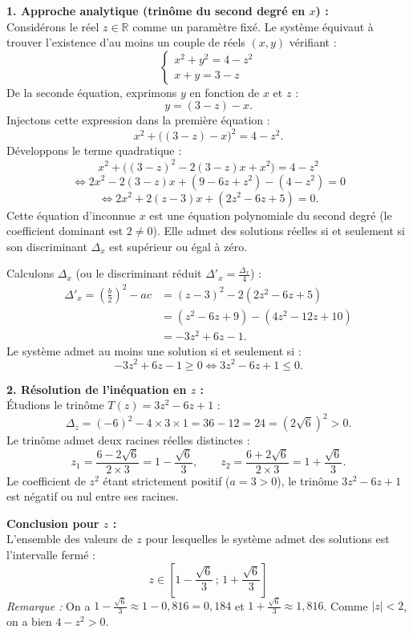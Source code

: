 \documentclass[11pt,a4paper]{article}
\begin{document}
\begin{correctionbox}
\textbf{1. Approche analytique (trinôme du second degré en $x$) :}\\
Considérons le réel $z \in \mathbb{R}$ comme un paramètre fixé.
Le système équivaut à trouver l'existence d'au moins un couple de réels $(x, y)$ vérifiant :
\[
\begin{cases}
x^2 + y^2 = 4 - z^2 \\
x + y = 3 - z
\end{cases}
\]
De la seconde équation, exprimons $y$ en fonction de $x$ et $z$ :
\[
y = (3 - z) - x.
\]
Injectons cette expression dans la première équation :
\[
x^2 + \bigl((3 - z) - x\bigr)^2 = 4 - z^2.
\]
Développons le terme quadratique :
\[
x^2 + \bigl((3 - z)^2 - 2(3 - z)x + x^2\bigr) = 4 - z^2
\]
\[
\iff 2x^2 - 2(3 - z)x + (9 - 6z + z^2) - (4 - z^2) = 0
\]
\[
\iff 2x^2 + 2(z - 3)x + (2z^2 - 6z + 5) = 0.
\]
Cette équation d'inconnue $x$ est une équation polynomiale du second degré (le coefficient dominant est $2 \neq 0$).
Elle admet des solutions réelles si et seulement si son discriminant $\Delta_x$ est supérieur ou égal à zéro.

Calculons $\Delta_x$ (ou le discriminant réduit $\Delta'_x = \frac{\Delta_x}{4}$) :
\[
\begin{aligned}
\Delta'_x = \left(\frac{b}{2}\right)^2 - ac &= (z - 3)^2 - 2(2z^2 - 6z + 5) \\
&= (z^2 - 6z + 9) - (4z^2 - 12z + 10) \\
&= -3z^2 + 6z - 1.
\end{aligned}
\]
Le système admet au moins une solution si et seulement si :
\[
-3z^2 + 6z - 1 \ge 0 \iff 3z^2 - 6z + 1 \le 0.
\]

\textbf{2. Résolution de l'inéquation en $z$ :}\\
Étudions le trinôme $T(z) = 3z^2 - 6z + 1$ :
\[
\Delta_z = (-6)^2 - 4 \times 3 \times 1 = 36 - 12 = 24 = (2\sqrt{6})^2 > 0.
\]
Le trinôme admet deux racines réelles distinctes :
\[
z_1 = \frac{6 - 2\sqrt{6}}{2 \times 3} = 1 - \frac{\sqrt{6}}{3}, \qquad z_2 = \frac{6 + 2\sqrt{6}}{2 \times 3} = 1 + \frac{\sqrt{6}}{3}.
\]
Le coefficient de $z^2$ étant strictement positif ($a = 3 > 0$), le trinôme $3z^2 - 6z + 1$ est négatif ou nul entre ses racines.

\textbf{Conclusion pour $z$ :}\\
L'ensemble des valeurs de $z$ pour lesquelles le système admet des solutions est l'intervalle fermé :
\[
\boxed{z \in \left[ 1 - \frac{\sqrt{6}}{3} \,;\, 1 + \frac{\sqrt{6}}{3} \right]}
\]
\textit{Remarque :} On a $1 - \frac{\sqrt{6}}{3} \approx 1 - 0{,}816 = 0{,}184$ et $1 + \frac{\sqrt{6}}{3} \approx 1{,}816$. Comme $|z| < 2$, on a bien $4 - z^2 > 0$.


\end{correctionbox}
\end{document}

